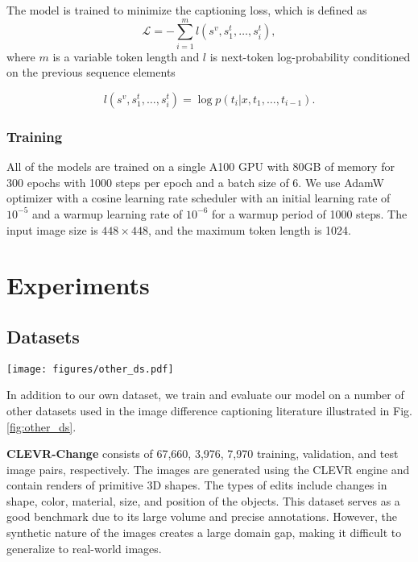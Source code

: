 \documentclass[10pt,twocolumn,letterpaper]{article}
\begin{document}
The model is trained to minimize the captioning loss, which is defined as
\begin{equation}
    \mathcal{L} = -\sum^{m}_{i=1}l(s^v, s^{t}_1, \ldots, s^{t}_i),
\end{equation}
where $m$ is a variable token length and $l$ is next-token log-probability conditioned on the previous sequence elements

\begin{equation}
    l(s^v, s^{t}_1, \ldots, s^{t}_i) = \log p(t_i| x, t_1, \ldots, t_{i-1}).
\end{equation}

\subsubsection{Training}
All of the models are trained on a single A100 GPU with 80GB of memory for 
300 epochs with 1000 steps per epoch and a batch size of 6. We use AdamW optimizer with a cosine learning
rate scheduler with an initial learning rate of $10^{-5}$ and a warmup learning rate
of $10^{-6}$ for a warmup period of 1000 steps. The input image size is $448\times448$, and 
the maximum token length is 1024.


\section{Experiments}
\subsection{Datasets}


\begin{figure*}[ht]
    \centering
    \texttt{[image: figures/other\_ds.pdf]}
    \caption{Examples of images and annotations from the CLEVR-Change, Spot-the-Diff, MagicBrush and PSBattles datasets.}
    \label{fig:other_ds}
\end{figure*}



In addition to our own dataset, we train and evaluate our model on a number of
other datasets used in the image difference captioning literature illustrated 
in Fig. \ref{fig:other_ds}.

\noindent\textbf{CLEVR-Change} \cite{clevr-change} consists of 67,660, 3,976, 7,970
training, validation, and test image pairs, respectively. The images are generated
using the CLEVR engine and contain renders of primitive 3D shapes. The types of
edits include changes in shape, color, material, size, and position of the objects.
This dataset serves as a good benchmark due to its large volume and precise
annotations. However, the synthetic nature of the images creates a large domain
gap, making it difficult to generalize to real-world images.
\end{document}
